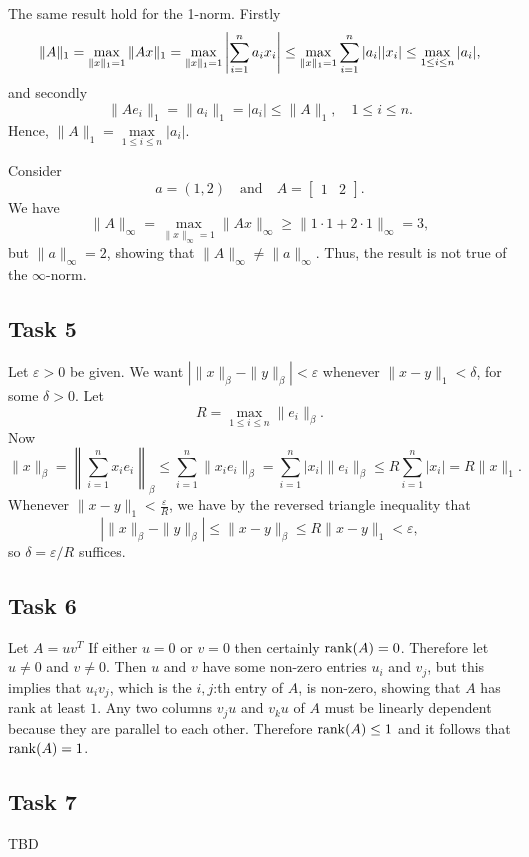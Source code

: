 \documentclass[a4paper,12pt]{article}
\begin{document}
The same result hold for the 1-norm.
Firstly
\[
  \|A\|_1
    = \max_{\|x\|_1 = 1} \|Ax\|_1\\
    = \max_{\|x\|_1 = 1} \left| \sum_{i=1}^n a_i x_i\right|
    \le \max_{\|x\|_1 = 1} \sum_{i=1}^n |a_i||x_i|
    \le \max_{1 \le i \le n} |a_i|,
\]
and secondly
\[ \|Ae_i\|_1 = \|a_i\|_1 = |a_i| \le \|A\|_1, \quad 1 \le i \le n. \]
Hence, $ \|A\|_1=\underset{1\le i \le n}{\max} |a_i|$.

Consider
\[
  a = (1, 2)
  \quad \text{and} \quad
  A =
    \begin{bmatrix}
      1 & 2
    \end{bmatrix}.
\]
We have
\[
  \|A\|_\infty
    = \max_{\|x\|_\infty = 1} \|Ax\|_\infty
    \ge \|1 \cdot 1 + 2 \cdot 1\|_\infty
    = 3,
\]
but \(\|a\|_\infty = 2\), showing that \(\|A\|_\infty \ne
\|a\|_\infty\).
Thus, the result is not true of the \(\infty\)-norm.


\subsection*{Task 5}

Let \(\varepsilon > 0\) be given.
We want \(\left|\|x\|_\beta - \|y\|_\beta\right| < \varepsilon\)
whenever \(\|x-y\|_1 < \delta\), for some \(\delta > 0\).
Let
\[ R = \max_{1 \le i \le n} \|e_i\|_\beta. \]
Now
\[
  \|x\|_\beta
    = \left\|\sum_{i=1}^n x_i e_i\right\|_\beta
    \le \sum_{i=1}^n \|x_i e_i\|_\beta
    = \sum_{i=1}^n |x_i| \|e_i\|_\beta
    \le R \sum_{i=1}^n |x_i|
    = R \|x\|_1.
\]
Whenever \(\|x-y\|_1 < \frac{\varepsilon}{R}\), we have by the reversed
triangle inequality that
\[
  \left|\|x\|_\beta - \|y\|_\beta\right|
    \le \|x - y\|_\beta
    \le R \|x - y\|_1
    < \varepsilon,
\]
so \(\delta = \varepsilon/R\) suffices.


\subsection*{Task 6}

Let \(A = uv^T\)
If either \(u = 0\) or \(v = 0\) then certainly \(\mathrm{rank}(A) = 0\).
Therefore let \(u \ne 0\) and \(v \ne 0\).
Then \(u\) and \(v\) have some non-zero entries \(u_i\) and \(v_j\), but this
implies that \(u_i v_j\), which is the \(i,j\):th entry of \(A\), is non-zero,
showing that \(A\) has rank at least \(1\).
Any two columns \(v_j u\) and \(v_k u\) of \(A\) must be linearly dependent
because they are parallel to each other.
Therefore \(\mathrm{rank}(A) \le 1\) and it follows that \(\mathrm{rank}(A) = 1\).


\subsection*{Task 7}

TBD
\end{document}
